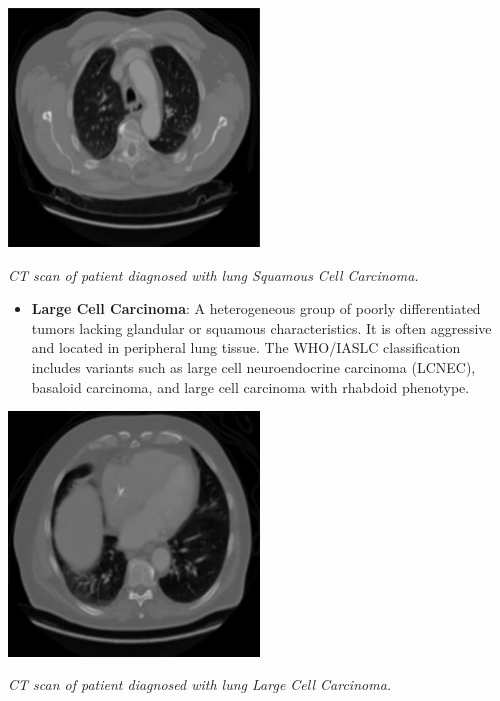 \vspace{1em}
\begin{center}
    \includegraphics[width=0.5\textwidth]{assets/01-overview/lc-scc-ct.jpg}

    \small\textit{CT scan of patient diagnosed with lung Squamous Cell Carcinoma. 
    \cite{SHATNAWI2025100188}}
\end{center}
\vspace{1em}

\begin{itemize}
    \item \textbf{Large Cell Carcinoma}: A heterogeneous group of poorly differentiated tumors 
    lacking glandular or squamous characteristics. It is often aggressive and located in peripheral 
    lung tissue. The WHO/IASLC classification includes variants such as large cell neuroendocrine 
    carcinoma (LCNEC), basaloid carcinoma, and large cell carcinoma with rhabdoid phenotype. 
    \cite{nlm2025}
\end{itemize}

\vspace{1em}
\begin{center}
    \includegraphics[width=0.5\textwidth]{assets/01-overview/lc-lcc-ct.jpg}

    \small\textit{CT scan of patient diagnosed with lung Large Cell Carcinoma. 
    \cite{SHATNAWI2025100188}}
\end{center}
\vspace{1em}

